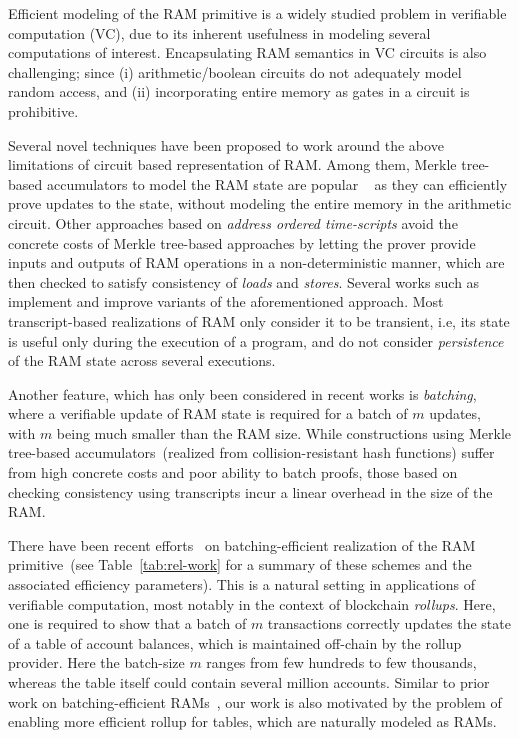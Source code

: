 Efficient modeling of the RAM primitive is a widely studied problem in
verifiable computation (VC), due to its inherent usefulness in modeling several computations of interest.
Encapsulating RAM semantics in VC circuits is also challenging; since (i) arithmetic/boolean circuits do not
adequately model random access, and (ii) incorporating entire memory as gates in a circuit is prohibitive.

Several novel techniques have been proposed to work around the above limitations of circuit based representation
of RAM. Among them, Merkle tree-based accumulators to model the RAM state are popular
~\cite{EPRINT:BFRSBW13,compwithstate,C:BCTV14} as they can efficiently
prove updates to the state, without modeling the entire memory in the arithmetic circuit. Other
approaches based on {\em address ordered time-scripts} avoid the concrete costs of Merkle tree-based approaches
by letting the prover provide inputs and outputs of RAM operations in a non-deterministic manner, which
are then checked to satisfy consistency of {\em loads} and {\em stores}.
Several works such as \cite{NDSS:WSRBW15,USENIX:BCTV14,C:BCGTV13,SP:ZGKPP18} implement and improve variants
of the aforementioned approach. Most transcript-based realizations of RAM only consider it to be transient,
i.e, its state is useful only during the execution of a program, and do not consider {\em persistence} of the
RAM state across several executions. 

Another feature, which has only been considered in recent works
\cite{USENIX:OWWB20,CCS:CFHKKO22} is {\em batching}, where a verifiable update of RAM state is required
for a batch of $m$ updates, with $m$ being much smaller than the RAM size. While constructions using Merkle tree-based accumulators~(realized from collision-resistant hash functions) suffer from high concrete costs and poor
ability to batch proofs, those based on checking consistency using transcripts incur a linear overhead in the
size of the RAM.

\smallskip

 There have been recent efforts~\cite{USENIX:OWWB20,CCS:CFHKKO22} on batching-efficient
realization of the RAM primitive~(see Table~\ref{tab:rel-work} for a summary of these schemes and the associated efficiency parameters). This is a natural setting in applications of verifiable
computation, most notably in the context of blockchain {\em rollups}. Here, one is required
to show that a batch of $m$ transactions correctly updates the state of a table of account balances, which
is maintained off-chain by the rollup provider. Here the batch-size $m$ ranges from few hundreds to few
thousands, whereas the table itself could contain several million accounts.
Similar to prior work on batching-efficient RAMs~\cite{USENIX:OWWB20,CCS:CFHKKO22}, our work is also motivated
 by the problem of enabling more efficient rollup for tables, which are
naturally modeled as RAMs.

